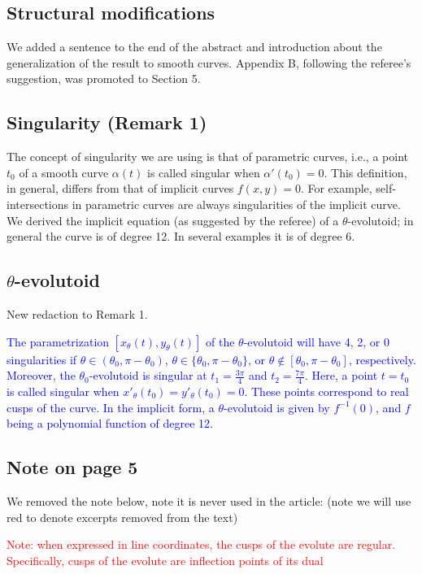 \subsection{Structural modifications}

We added a sentence to the end of the abstract and introduction about the generalization of the result to smooth curves. Appendix B, following the referee's suggestion, was promoted to Section 5.

\subsection{Singularity (Remark 1)}
The concept of singularity we are using is that of parametric curves, i.e., a point $t_0$ of a smooth curve $\alpha(t)$ is called singular when $\alpha'(t_0)=0$. This definition, in general, differs from that of implicit curves $f(x,y)=0$. For example, self-intersections in parametric curves are always singularities of the implicit curve. We derived the implicit equation (as suggested by the referee) of a $\theta$-evolutoid; in general the curve is of degree 12. In several examples  it is of degree 6.
\subsection{$\theta$-evolutoid}

New redaction to Remark 1.

\textcolor{blue}{ 
\begin{remark*}
 The parametrization $[x_\theta(t), y_\theta(t)]$ of the $\theta$-evolutoid will   have 4, 2, or 0 singularities if
$\theta\in(\theta_0,\pi-\theta_0)$, $\theta\in\{\theta_0,\pi-\theta_0\}$, or $\theta\notin[\theta_0,\pi-\theta_0]$, respectively. Moreover, the ${\theta_0}$-evolutoid is singular at $t_1=\frac{3\pi}{4}$ and
	$t_2=  \frac{7\pi}{4}$.
	Here, a  point $t=t_0$ is called singular when $x'_\theta(t_0)=y'_\theta(t_0)=0$.
	These points correspond to real cusps of the curve.  
	In the implicit form,   a  $\theta$-evolutoid is given by $f^{-1}(0)$, and $f$ being a polynomial   function of degree 12.
\end{remark*}
}
\subsection{Note on page 5} We removed the note below, note it is never used in the article: (note we will use red to denote excerpts removed from the text)

\textcolor{red}{  
Note: when expressed in line coordinates, the cusps of the evolute are regular. Specifically, cusps of the evolute are inflection points of its dual %
}


